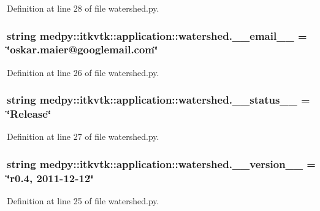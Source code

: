 Definition at line 28 of file watershed.py.

\hypertarget{namespacemedpy_1_1itkvtk_1_1application_1_1watershed_a4cc460824fba5470e44794c2fb834474}{
\subsubsection[{\_\-\_\-email\_\-\_\-}]{\setlength{\rightskip}{0pt plus 5cm}string {\bf medpy::itkvtk::application::watershed.\_\-\_\-email\_\-\_\-} = \char`\"{}oskar.maier@googlemail.com\char`\"{}}}
\label{namespacemedpy_1_1itkvtk_1_1application_1_1watershed_a4cc460824fba5470e44794c2fb834474}


Definition at line 26 of file watershed.py.

\hypertarget{namespacemedpy_1_1itkvtk_1_1application_1_1watershed_a47da6249d108e5519b54ffc9df02367e}{
\subsubsection[{\_\-\_\-status\_\-\_\-}]{\setlength{\rightskip}{0pt plus 5cm}string {\bf medpy::itkvtk::application::watershed.\_\-\_\-status\_\-\_\-} = \char`\"{}Release\char`\"{}}}
\label{namespacemedpy_1_1itkvtk_1_1application_1_1watershed_a47da6249d108e5519b54ffc9df02367e}


Definition at line 27 of file watershed.py.

\hypertarget{namespacemedpy_1_1itkvtk_1_1application_1_1watershed_a39da6aadd6bcf0711b328c7975ed27d7}{
\subsubsection[{\_\-\_\-version\_\-\_\-}]{\setlength{\rightskip}{0pt plus 5cm}string {\bf medpy::itkvtk::application::watershed.\_\-\_\-version\_\-\_\-} = \char`\"{}r0.4, 2011-\/12-\/12\char`\"{}}}
\label{namespacemedpy_1_1itkvtk_1_1application_1_1watershed_a39da6aadd6bcf0711b328c7975ed27d7}


Definition at line 25 of file watershed.py.

